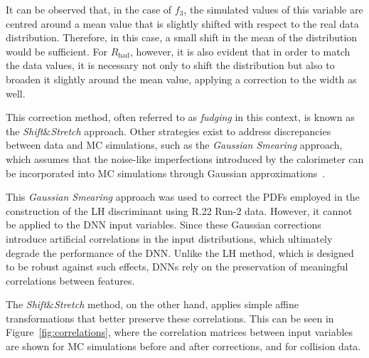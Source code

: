 It can be observed that, in the case of $f_3$, the simulated values of this variable are centred around a mean value that is slightly shifted with respect to the real data distribution. Therefore, in this case, a small shift in the mean of the distribution would be sufficient. 
For $R_{\text{had}}$, however, it is also evident that in order to match the data values, it is necessary not only to shift the distribution but also to broaden it slightly around the mean value, applying a correction to the width as well.

This correction method, often referred to as \textit{fudging} in this context, is known as the \textit{Shift}$\&$\textit{Stretch} approach. Other strategies exist to address discrepancies between data and MC simulations, such as the \textit{Gaussian Smearing} approach, which assumes that the noise-like imperfections introduced by the calorimeter can be incorporated into MC simulations through Gaussian approximations~\cite{Puddefoot:2797826}.

This \textit{Gaussian Smearing} approach was used to correct the PDFs employed in the construction of the LH discriminant using R.22 Run-2 data. However, it cannot be applied to the DNN input variables. Since these Gaussian corrections introduce artificial correlations in the input distributions, which ultimately degrade the performance of the DNN. Unlike the LH method, which is designed to be robust against such effects, DNNs rely on the preservation of meaningful correlations between features.

The \textit{Shift}$\&$\textit{Stretch} method, on the other hand, applies simple affine transformations that better preserve these correlations. This can be seen in Figure~\ref{fig:correlations}, where the correlation matrices between input variables are shown for MC simulations before and after corrections, and for collision data.

